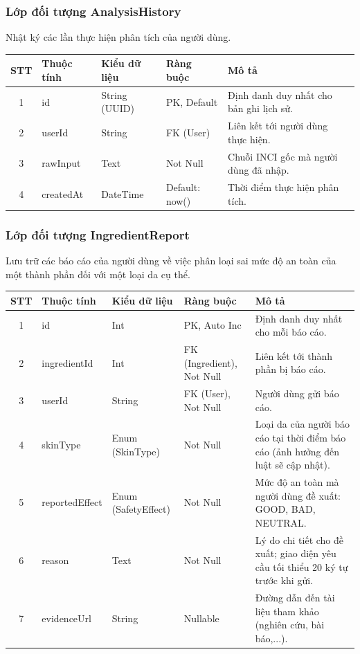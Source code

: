 \documentclass[12pt,a4paper]{article}
\begin{document}
\subsubsection{Lớp đối tượng AnalysisHistory}
Nhật ký các lần thực hiện phân tích của người dùng.

\begin{center}
\renewcommand{\arraystretch}{1.4}
\begin{tabularx}{\textwidth}{|c|l|l|l|X|}
\hline
\rowcolor{blue!15}
\textbf{STT} & \textbf{Thuộc tính} & \textbf{Kiểu dữ liệu} & \textbf{Ràng buộc} & \textbf{Mô tả} \\ \hline
1 & id & String (UUID) & PK, Default & Định danh duy nhất cho bản ghi lịch sử. \\ \hline
2 & userId & String & FK (User) & Liên kết tới người dùng thực hiện. \\ \hline
3 & rawInput & Text & Not Null & Chuỗi INCI gốc mà người dùng đã nhập. \\ \hline
4 & createdAt & DateTime & Default: now() & Thời điểm thực hiện phân tích. \\ \hline
\end{tabularx}
\end{center}




\subsubsection{Lớp đối tượng IngredientReport}
Lưu trữ các báo cáo của người dùng về việc phân loại sai mức độ an toàn của một thành phần đối với một loại da cụ thể.

\begin{center}
\renewcommand{\arraystretch}{1.4}
\begin{tabularx}{\textwidth}{|c|l|l|l|X|}
\hline
\rowcolor{blue!15}
\textbf{STT} & \textbf{Thuộc tính} & \textbf{Kiểu dữ liệu} & \textbf{Ràng buộc} & \textbf{Mô tả} \\ \hline
1 & id & Int & PK, Auto Inc & Định danh duy nhất cho mỗi báo cáo. \\ \hline
2 & ingredientId & Int & FK (Ingredient), Not Null & Liên kết tới thành phần bị báo cáo. \\ \hline
3 & userId & String & FK (User), Not Null & Người dùng gửi báo cáo. \\ \hline
4 & skinType & Enum (SkinType) & Not Null & Loại da của người báo cáo tại thời điểm báo cáo (ảnh hưởng đến luật sẽ cập nhật). \\ \hline
5 & reportedEffect & Enum (SafetyEffect) & Not Null & Mức độ an toàn mà người dùng đề xuất: GOOD, BAD, NEUTRAL. \\ \hline
6 & reason & Text & Not Null & Lý do chi tiết cho đề xuất; giao diện yêu cầu tối thiểu 20 ký tự trước khi gửi. \\ \hline
7 & evidenceUrl & String & Nullable & Đường dẫn đến tài liệu tham khảo (nghiên cứu, bài báo,...). \\ \hline
\end{tabularx}
\end{center}
\end{document}
